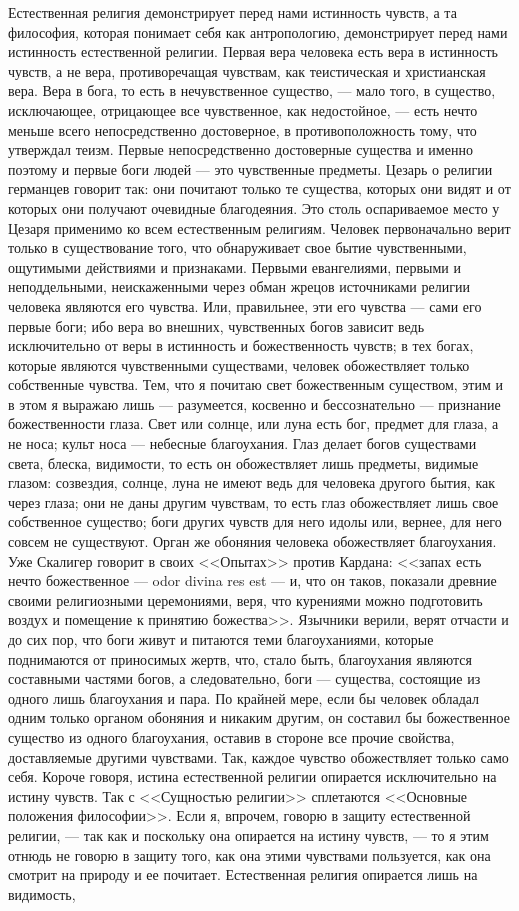 \documentclass[12pt]{article}
\begin{document}
Естественная религия демонстрирует перед нами истинность чувств, а та философия, которая понимает себя как антропологию, демонстрирует перед нами истинность естественной религии. Первая вера человека есть вера в истинность чувств, а не вера, противоречащая чувствам, как теистическая и христианская вера. Вера в бога, то есть в нечувственное существо, --- мало того, в существо, исключающее, отрицающее все чувственное, как недостойное, --- есть нечто меньше всего непосредственно достоверное, в противоположность тому, что утверждал теизм. Первые непосредственно достоверные существа и именно поэтому и первые боги людей --- это чувственные предметы. Цезарь о религии германцев говорит так: они почитают только те существа, которых они видят и от которых они получают очевидные благодеяния. Это столь оспариваемое место у Цезаря применимо ко всем естественным религиям. Человек первоначально верит только в существование того, что обнаруживает свое бытие чувственными, ощутимыми действиями и признаками. Первыми евангелиями, первыми и неподдельными, неискаженными через обман жрецов источниками религии человека являются его чувства. Или, правильнее, эти его чувства --- сами его первые боги; ибо вера во внешних, чувственных богов зависит ведь исключительно от веры в истинность и божественность чувств; в тех богах, которые являются чувственными существами, человек обожествляет только собственные чувства. Тем, что я почитаю свет божественным существом, этим и в этом я выражаю лишь --- разумеется, косвенно и бессознательно --- признание божественности глаза. Свет или солнце, или луна есть бог, предмет для глаза, а не носа; культ носа --- небесные благоухания. Глаз делает богов существами света, блеска, видимости, то есть он обожествляет лишь предметы, видимые глазом: созвездия, солнце, луна не имеют ведь для человека другого бытия, как через глаза; они не даны другим чувствам, то есть глаз обожествляет лишь свое собственное существо; боги других чувств для него идолы или, вернее, для него совсем не существуют. Орган же обоняния человека обожествляет благоухания. Уже Скалигер говорит в своих <<Опытах>> против Кардана: <<запах есть нечто божественное --- odor divina res est --- и, что он таков, показали древние своими религиозными церемониями, веря, что курениями можно подготовить воздух и помещение к принятию божества>>. Язычники верили, верят отчасти и до сих пор, что боги живут и питаются теми благоуханиями, которые поднимаются от приносимых жертв, что, стало быть, благоухания являются составными частями богов, а следовательно, боги --- существа, состоящие из одного лишь благоухания и пара. По крайней мере, если бы человек обладал одним только органом обоняния и никаким другим, он составил бы божественное существо из одного благоухания, оставив в стороне все прочие свойства, доставляемые другими чувствами. Так, каждое чувство обожествляет только само себя. Короче говоря, истина естественной религии опирается исключительно на истину чувств. Так с <<Сущностью религии>> сплетаются <<Основные положения философии>>. Если я, впрочем, говорю в защиту естественной религии, --- так как и поскольку она опирается на истину чувств, --- то я этим отнюдь не говорю в защиту того, как она этими чувствами пользуется, как она смотрит на природу и ее почитает. Естественная религия опирается лишь на видимость, 
\end{document}
